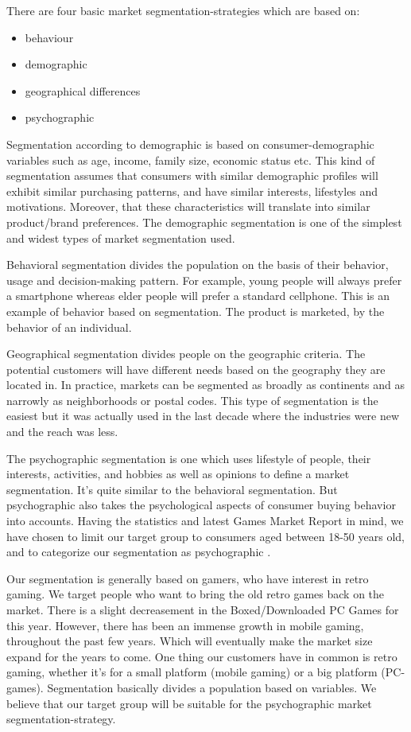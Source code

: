 \documentclass[12p]{article}
\begin{document}
There are four basic market segmentation-strategies which are based on: 

\begin{itemize}
  \item behaviour
  \item demographic
  \item geographical differences
  \item psychographic
\end{itemize}

Segmentation according to demographic is based on consumer-demographic variables such as age, income, family size, economic status etc. This kind of segmentation assumes that consumers with similar demographic profiles will exhibit similar purchasing patterns, and have similar interests, lifestyles and motivations. Moreover, that these characteristics will translate into similar product/brand preferences. The demographic segmentation is one of the simplest and widest types of market segmentation used. 

Behavioral segmentation divides the population on the basis of their behavior, usage and decision-making pattern. For example, young people will always prefer a smartphone whereas elder people will prefer a standard cellphone. This is an example of behavior based on segmentation. The product is marketed, by the behavior of an individual. 

Geographical segmentation divides people on the geographic criteria. The potential customers will have different needs based on the geography they are located in. In practice, markets can be segmented as broadly as continents and as narrowly as neighborhoods or postal codes. This type of segmentation is the easiest but it was actually used in the last decade where the industries were new and the reach was less.

The psychographic segmentation is one which uses lifestyle of people, their interests, activities, and hobbies as well as opinions to define a market segmentation. It’s quite similar to the behavioral segmentation. But psychographic also takes the psychological aspects of consumer buying behavior into accounts. Having the statistics and latest Games Market Report in mind, we have chosen to limit our target group to consumers aged between 18-50 years old, and to categorize our segmentation as psychographic \cite{MarketSegmentation}.

Our segmentation is generally based on gamers, who have interest in retro gaming. We target people who want to bring the old retro games back on the market. There is a slight decreasement in the Boxed/Downloaded PC Games for this year. However, there has been an immense growth in mobile gaming, throughout the past few years. Which will eventually make the market size expand for the years to come. One thing our customers have in common is retro gaming, whether it's for a small platform (mobile gaming) or a big platform (PC-games). Segmentation basically divides a population based on variables. We believe that our target group will be suitable for the psychographic market segmentation-strategy.  
\end{document}
